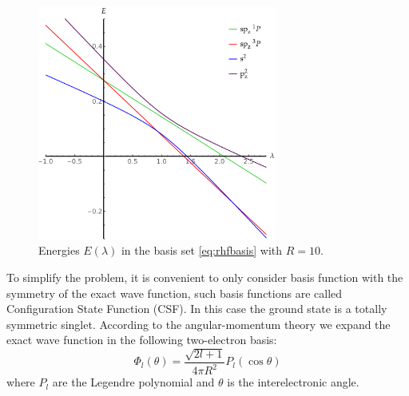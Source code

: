 \documentclass[11pt,a4paper]{article}
\begin{document}
\begin{figure}[h!]
    \centering
    \includegraphics[width=0.7\textwidth]{EMP_RHF_R10.pdf}
    \caption{\centering Energies $E(\lambda)$ in the basis set \eqref{eq:rhfbasis} with $R=10$.}
    \label{fig:RHFMiniBas}
\end{figure}

To simplify the problem, it is convenient to only consider basis function with the symmetry of the exact wave function, such basis functions are called Configuration State Function (CSF). In this case the ground state is a totally symmetric singlet. According to the angular-momentum theory we expand the exact wave function in the following two-electron basis:
\begin{equation}
\Phi_l(\theta)=\frac{\sqrt{2l+1}}{4\pi R^2}P_l(\cos\theta)
\end{equation}
where $P_l$ are the Legendre polynomial and $\theta$ is the interelectronic angle.
\end{document}
